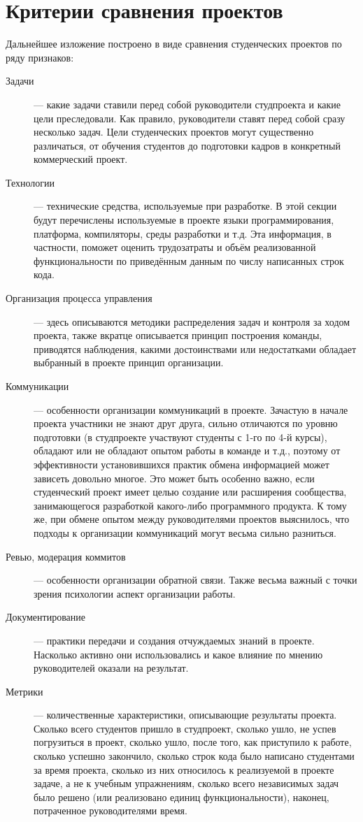 \documentclass[a5paper]{article}
\begin{document}
\section{Критерии сравнения проектов}
Дальнейшее изложение построено в виде сравнения студенческих проектов по ряду признаков:
\begin{description}
	\item[Задачи] --- какие задачи ставили перед собой руководители студпроекта и какие цели преследовали. Как правило, руководители ставят перед собой сразу несколько задач. Цели студенческих проектов могут существенно различаться, от обучения студентов до подготовки кадров в конкретный коммерческий проект.
	\item[Технологии] --- технические средства, используемые при разработке. В этой секции будут перечислены используемые в проекте языки программирования, платформа, компиляторы, среды разработки и т.д. Эта информация, в частности, поможет оценить трудозатраты и объём реализованной функциональности по приведённым данным по числу написанных строк кода.
	\item[Организация процесса управления] --- здесь описываются методики распределения задач и контроля за ходом проекта, также вкратце описывается принцип построения команды, приводятся наблюдения, какими достоинствами или недостатками обладает выбранный в проекте принцип организации.
	\item[Коммуникации] --- особенности организации коммуникаций в проекте. Зачастую в начале проекта участники не знают друг друга, сильно отличаются по уровню подготовки (в студпроекте участвуют студенты с 1-го по 4-й курсы), обладают или не обладают опытом работы в команде и т.д., поэтому от эффективности установившихся практик обмена информацией может зависеть довольно многое. Это может быть особенно важно, если студенческий проект имеет целью создание или расширения сообщества, занимающегося разработкой какого-либо программного продукта. К тому же, при обмене опытом между руководителями проектов выяснилось, что подходы к организации коммуникаций могут весьма сильно разниться.
	\item[Ревью, модерация коммитов] --- особенности организации обратной связи. Также весьма важный с точки зрения психологии аспект организации работы.
	\item[Документирование] --- практики передачи и создания отчуждаемых знаний в проекте. Насколько активно они использовались и какое влияние по мнению руководителей оказали на результат.
	\item[Метрики] --- количественные характеристики, описывающие результаты проекта. Сколько всего студентов пришло в студпроект, сколько ушло, не успев погрузиться в проект, сколько ушло, после того, как приступило к работе, сколько успешно закончило, сколько строк кода было написано студентами за время проекта, сколько из них относилось к реализуемой в проекте задаче, а не к учебным упражнениям, сколько всего независимых задач было решено (или реализовано единиц функциональности), наконец, потраченное руководителями время.
\end{description}
\end{document}
